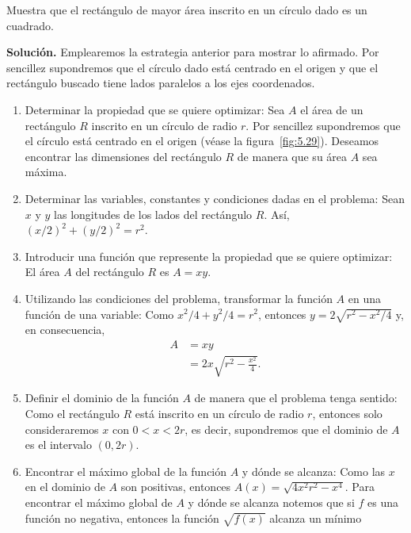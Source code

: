\documentclass[12pt,a4paper]{book}
\begin{document}
    \begin{ejemplo}\label{ejm:98}
        Muestra que el rectángulo de mayor área inscrito en un círculo
        dado es un cuadrado.

        \textbf{Solución.} Emplearemos la estrategia anterior para mostrar lo afirmado.
        Por sencillez supondremos que el círculo dado está centrado en el origen y
        que el rectángulo buscado tiene lados paralelos a los ejes coordenados.
        \begin{enumerate}[label=\arabic*.]
            \item Determinar la propiedad que se quiere optimizar: Sea $A$ el área de un
            rectángulo $R$ inscrito en un círculo de radio $r$. Por sencillez supondremos
            que el círculo está centrado en el origen (véase la figura~\ref{fig:5.29}). Deseamos
            encontrar las dimensiones del rectángulo $R$ de manera que su área $A$ sea
            máxima.
            \item Determinar las variables, constantes y condiciones dadas en el problema:
            Sean $x$ y $y$ las longitudes de los lados del rectángulo $R$. Así, $(x/2)^{2}+
            (y/2)^{2}=r^{2}$.
            \item Introducir una función que represente la propiedad que se quiere optimizar:
            El área $A$ del rectángulo $R$ es $A=xy$.
            \item Utilizando las condiciones del problema, transformar la función $A$ en
            una función de una variable: Como $x^{2}/4+y^{2}/4=r^{2}$, entonces $y=
            2\sqrt{r^{2}-x^{2}/4}$ y, en consecuencia,
            \begin{align*}
                A&=xy\\
                &=2x\sqrt{r^{2}-\frac{x^{2}}{4}}.
            \end{align*}
            \item Definir el dominio de la función $A$ de manera que el problema tenga sentido:
            Como el rectángulo $R$ está inscrito en un círculo de radio $r$, entonces
            solo consideraremos $x$ con $0<x<2r$, es decir, supondremos que el dominio
            de $A$ es el intervalo $(0,2r)$.
            \item Encontrar el máximo global de la función $A$ y dónde se alcanza: Como las
            $x$ en el dominio de $A$ son positivas, entonces $A(x)=\sqrt{4x^{2}r^{2}-x^{4}}$. Para
            encontrar el máximo global de $A$ y dónde se alcanza notemos que si $f$ es
            una función no negativa, entonces la función $\sqrt{f(x)}$ alcanza un mínimo

\end{enumerate}
\end{ejemplo}
\end{document}
